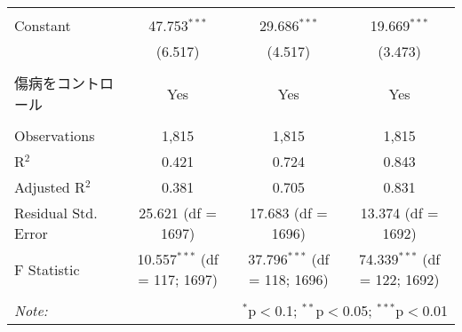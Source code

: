 \documentclass{jsarticle}
\begin{document}
\begin{table}[!htbp]
\begin{tabular}{@{\extracolsep{5pt}}lccc}
  & & & \\ 
 Constant & 47.753$^{***}$ & 29.686$^{***}$ & 19.669$^{***}$ \\ 
  & (6.517) & (4.517) & (3.473) \\ 
  & & & \\ 
  傷病をコントロール & Yes & Yes & Yes \\
\hline \\[-1.8ex] 
Observations & 1,815 & 1,815 & 1,815 \\ 
R$^{2}$ & 0.421 & 0.724 & 0.843 \\ 
Adjusted R$^{2}$ & 0.381 & 0.705 & 0.831 \\ 
Residual Std. Error & 25.621 (df = 1697) & 17.683 (df = 1696) & 13.374 (df = 1692) \\ 
F Statistic & 10.557$^{***}$ (df = 117; 1697) & 37.796$^{***}$ (df = 118; 1696) & 74.339$^{***}$ (df = 122; 1692) \\ 
\hline 
\hline \\[-1.8ex] 
\textit{Note:}  & \multicolumn{3}{r}{$^{*}$p$<$0.1; $^{**}$p$<$0.05; $^{***}$p$<$0.01} \\ 
\end{tabular} 
\end{table} 
\end{document}
